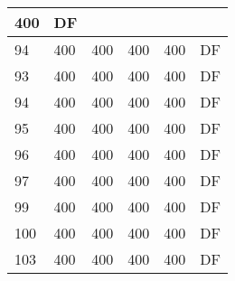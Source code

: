 \begin{table}[]
\begin{tabular}{lllll|l|}
400                                & DF                                    \\ \hline
94                                  & 400                                & 400                                & 400                                & 
400                                & DF                                    \\ \hline
93                                  & 400                                & 400                                & 400                                & 
400                                & DF                                    \\ \hline
94                                  & 400                                & 400                                & 400                                & 
400                                & DF                                    \\ \hline
95                                  & 400                                & 400                                & 400                                & 
400                                & DF                                    \\ \hline
96                                  & 400                                & 400                                & 400                                & 
400                                & DF                                    \\ \hline
97                                  & 400                                & 400                                & 400                                & 
400                                & DF                                    \\ \hline
99                                  & 400                                & 400                                & 400                                & 
400                                & DF                                    \\ \hline
100                                 & 400                                & 400                                & 400                                & 
400                                & DF                                    \\ \hline
103                                 & 400                                & 400                                & 400                                & 
400                                & DF                                    \\ \hline

\end{tabular}
\end{table}
